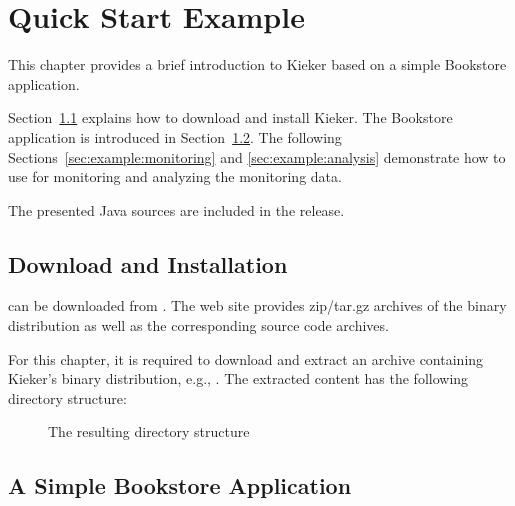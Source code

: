 \chapter{Quick Start Example}

This chapter provides a brief introduction to Kieker based on %
a simple Bookstore application. %

Section~\ref{sec:example:downloadInstall} explains how to download and install %
Kieker. %
The Bookstore application is introduced in Section~\ref{sec:example:bookstore}. %
The following Sections~\ref{sec:example:monitoring} %
and \ref{sec:example:analysis} demonstrate how to use \Kieker{} for monitoring %
and analyzing the monitoring data. %

\notify The presented Java sources are included in the \Kieker{} release.

\section{Download and Installation}\label{sec:example:downloadInstall}

\Kieker{} can be downloaded from \KiekerURL. The web %
site provides zip/tar.gz archives of the \Kieker{} binary distribution as well %
as the corresponding \Kieker{} source code archives.

For this chapter, it is required to download and extract an archive containing %
Kieker's binary distribution, e.g., \file{\binaryFileForDownload}.
The extracted content has the following directory structure:
\begin{figure}[H]
\vspace{1ex}


\caption{The resulting directory structure}

\end{figure}
\section{A Simple Bookstore Application}\label{sec:example:bookstore}

